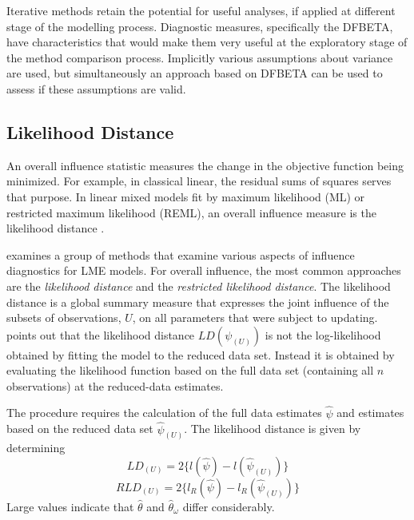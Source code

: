 \documentclass[12pt, a4paper]{report}
\theoremstyle{plain}
\theoremstyle{definition}
\theoremstyle{remark}
\begin{document}
	
	Iterative methods retain the potential for useful analyses, if applied at different stage of the modelling process. Diagnostic measures, specifically the DFBETA, have characteristics that would make them very useful at the exploratory stage of the method comparison process. Implicitly various assumptions about variance are used, but simultaneously an approach based on DFBETA can be used to assess if these assumptions are valid.
	
	

	\subsection{Likelihood Distance}
	An overall influence statistic measures the change in the objective function being minimized. For example, in
	classical linear, the residual sums of squares serves that purpose. In linear mixed models fit by
	 maximum likelihood (ML) or  restricted maximum likelihood (REML), an overall influence measure is the  likelihood distance \citep{CookWeisberg}.
	
	\citet{west} examines a group of methods that examine various aspects of influence diagnostics for LME models. For overall influence, the most common approaches are the \textit{likelihood distance} and the \textit{restricted likelihood distance}.	
	The  likelihood distance is a global summary measure that expresses the joint influence of the subsets of observations, $U$, on all parameters that were subject to updating. \citet{schabenberger} points out that the likelihood distance $LD(\psi_{(U)})$ is not the log-likelihood obtained by fitting the model to the reduced data set. Instead it is obtained by evaluating the likelihood function based on the full data set (containing all $n$ observations) at the reduced-data estimates.
	
	
	
	
	
	The
	procedure requires the calculation of the full data estimates
	$\hat{\psi}$ and estimates based on the reduced data set
	$\hat{\psi}_{(U)}$. The likelihood distance is given by
	determining
	\[
	LD_{(U)} = 2\{l(\hat{\psi}) - l( \hat{\psi}_{(U)}) \}\]\[
	RLD_{(U)} = 2\{l_{R}(\hat{\psi}) - l_{R}(\hat{\psi}_{(U)})\}
	\]
	Large values indicate that ${\hat{\theta}}$ and ${\hat{\theta}_\omega}$ differ considerably.
	
\end{document}

